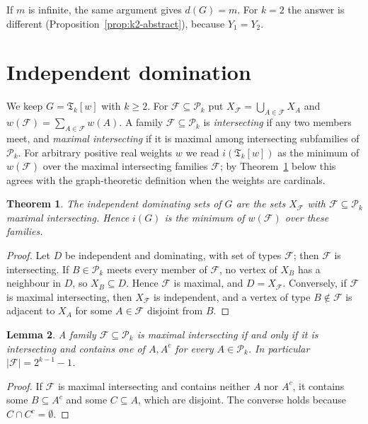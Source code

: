 \documentclass[11pt]{amsart}
\newtheorem{theorem}{Theorem}[section]
\newtheorem{lemma}[theorem]{Lemma}
\theoremstyle{definition}
\theoremstyle{remark}
\newcommand{\TG}{\mathfrak{T}}
\newcommand{\Pk}{\mathcal{P}_k}
\newcommand{\F}{\mathcal{F}}
\newcommand{\co}[1]{{#1}^{c}}
\begin{document}
If $m$ is infinite, the same argument gives $d(G)=m$. For $k=2$ the answer is different
(Proposition~\ref{prop:k2-abstract}), because $Y_1=Y_2$.

\section{Independent domination}\label{sec:independent}

We keep $G=\TG_k[w]$ with $k\ge2$. For $\F\subseteq\Pk$ put $X_\F=\bigcup_{A\in\F}X_A$ and
$w(\F)=\sum_{A\in\F}w(A)$. A family $\F\subseteq\Pk$ is \emph{intersecting} if any two members
meet, and \emph{maximal intersecting} if it is maximal among intersecting subfamilies of $\Pk$.
For arbitrary positive real weights $w$ we read $i(\TG_k[w])$ as the minimum of $w(\F)$ over the
maximal intersecting families $\F$; by Theorem~\ref{thm:indep-char} below this agrees with the
graph-theoretic definition when the weights are cardinals.

\begin{theorem}\label{thm:indep-char}
The independent dominating sets of $G$ are the sets $X_\F$ with $\F\subseteq\Pk$ maximal
intersecting. Hence $i(G)$ is the minimum of $w(\F)$ over these families.
\end{theorem}

\begin{proof}
Let $D$ be independent and dominating, with set of types $\F$; then $\F$ is intersecting. If $B\in\Pk$
meets every member of $\F$, no vertex of $X_B$ has a neighbour in $D$, so $X_B\subseteq D$. Hence
$\F$ is maximal, and $D=X_\F$. Conversely, if $\F$ is maximal intersecting, then $X_\F$ is
independent, and a vertex of type $B\notin\F$ is adjacent to $X_A$ for some $A\in\F$ disjoint from
$B$.
\end{proof}

\begin{lemma}\label{lem:one-of-each}
A family $\F\subseteq\Pk$ is maximal intersecting if and only if it is intersecting and contains
one of $A,\co A$ for every $A\in\Pk$. In particular $|\F|=2^{k-1}-1$.
\end{lemma}

\begin{proof}
If $\F$ is maximal intersecting and contains neither $A$ nor $\co A$, it contains some
$B\subseteq\co A$ and some $C\subseteq A$, which are disjoint. The converse holds because
$C\cap\co C=\emptyset$.
\end{proof}
\end{document}
